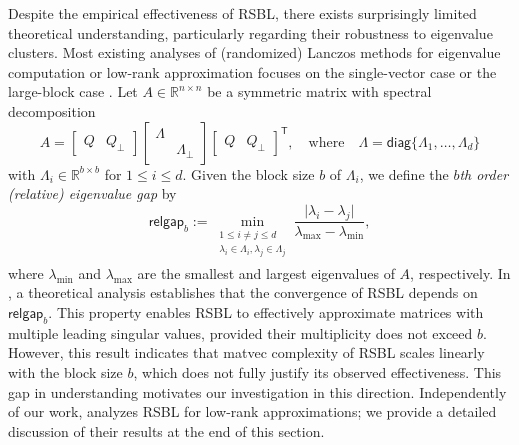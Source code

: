 \documentclass{article}
\newcommand{\Ttran}{\mathsf{T}}
\newcommand{\defi}{:=}
\newcommand{\R}{\mathbb{R}}
\newcommand{\gap}{\mathsf{relgap}}
\providecommand{\diagm}{\mathsf{diag}}
\providecommand{\abs}[1]{\lvert#1\rvert}
\begin{document}
Despite the empirical effectiveness of RSBL, there exists surprisingly limited theoretical understanding, particularly regarding their robustness to eigenvalue clusters. Most existing analyses of (randomized) Lanczos methods for eigenvalue computation or low-rank approximation focuses on the single-vector case \cite{kressner2024randomized,Meyer2023,Saad1980,Kaniel1966} or the large-block case \cite{Tropp2022,Li2015,Musco2015,Drineas2018,persson2025randomized,tropp2023randomized}. 
Let $A\in\R^{n\times n}$ be a symmetric matrix with spectral decomposition
    \begin{equation*}
        A = \begin{bmatrix}
            Q & Q_{\perp}
        \end{bmatrix} 
        \begin{bmatrix}
            \Lambda&\\ 
            &\Lambda_{\perp}
        \end{bmatrix}
        \begin{bmatrix}
            Q & Q_{\perp}
        \end{bmatrix}^{\Ttran},
        \quad \text{where}\quad \Lambda = \diagm\{ \Lambda_{1},\dotsc,\Lambda_{d} \}
    \end{equation*}
    with $\Lambda_{i}\in\R^{b\times b}$ for $1\leq i\leq d$. Given the block size $b$ of $\Lambda_{i}$, we define the \emph{$b$th order (relative) eigenvalue gap} by 
    \begin{equation}
        \label{eq:defgap}
    \gap_{b} \defi \min_{\substack{1\leq i\neq j\leq d\\     
    \lambda_{i}\in \Lambda_{i}, \lambda_{j}\in \Lambda_{j}\\ }}
    \frac{\abs{\lambda_{i}-\lambda_{j}}}{\lambda_{\max}-\lambda_{\min}},
\end{equation}
where $\lambda_{\min}$ and $\lambda_{\max}$ are the smallest and largest eigenvalues of $A$, respectively. 
In \cite[Thm.~4.5]{Meyer2023}, a theoretical analysis establishes that the convergence of RSBL depends on $\gap_{b}$. This property enables RSBL to effectively approximate matrices with multiple leading singular values, provided their multiplicity does not exceed $b$.
However, this result indicates that matvec complexity of RSBL scales linearly with the block size $b$, which does not fully justify its observed effectiveness. This gap in understanding motivates our investigation in this direction.
Independently of our work, \cite{Chen2026} analyzes RSBL for low-rank approximations; we provide a detailed discussion of their results at the end of this section.
\end{document}
